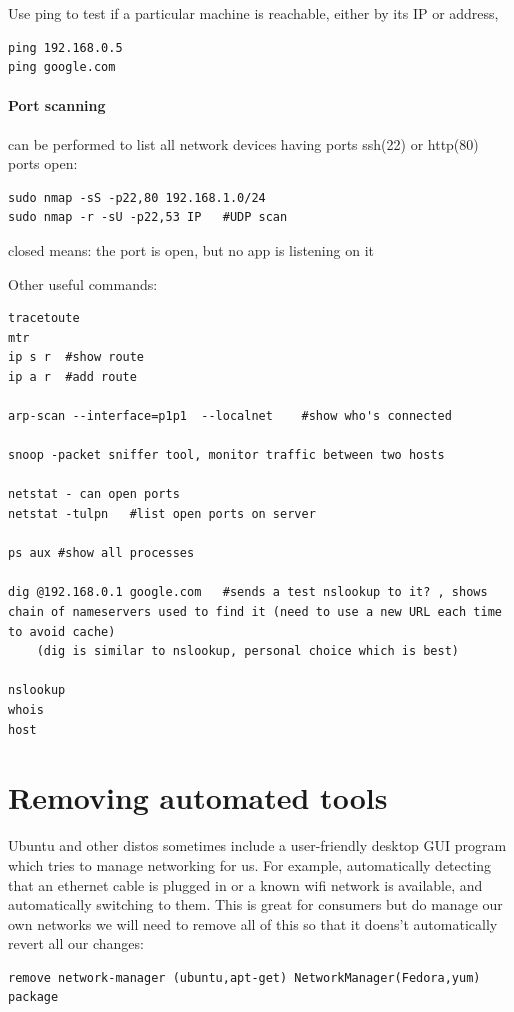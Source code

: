\documentclass[oneside,english]{scrbook}
\begin{document}
Use ping to test if a particular machine is reachable, either by its IP or address,
\begin{lstlisting}
ping 192.168.0.5
ping google.com
\end{lstlisting}

\paragraph{Port scanning} can be performed to list all network devices having ports ssh(22) or http(80) ports open:
\begin{lstlisting}
sudo nmap -sS -p22,80 192.168.1.0/24
sudo nmap -r -sU -p22,53 IP   #UDP scan
\end{lstlisting}
closed means: the port is open, but no app is listening on it

Other useful commands:
\begin{lstlisting}
tracetoute
mtr
ip s r  #show route
ip a r  #add route

arp-scan --interface=p1p1  --localnet    #show who's connected

snoop -packet sniffer tool, monitor traffic between two hosts

netstat - can open ports
netstat -tulpn   #list open ports on server

ps aux #show all processes

dig @192.168.0.1 google.com   #sends a test nslookup to it? , shows chain of nameservers used to find it (need to use a new URL each time to avoid cache)
    (dig is similar to nslookup, personal choice which is best)

nslookup
whois
host
\end{lstlisting}


\section{Removing automated tools}
Ubuntu and other distos sometimes include a user-friendly desktop GUI program which tries to manage networking for us. For example, automatically detecting that an ethernet cable is plugged in or a known wifi network is available, and automatically switching to them.  This is great for consumers but do manage our own networks we will need to remove all of this so that it doens't automatically revert all our changes:

\begin{lstlisting}
remove network-manager (ubuntu,apt-get) NetworkManager(Fedora,yum) package 
\end{lstlisting}
  
\end{document}
